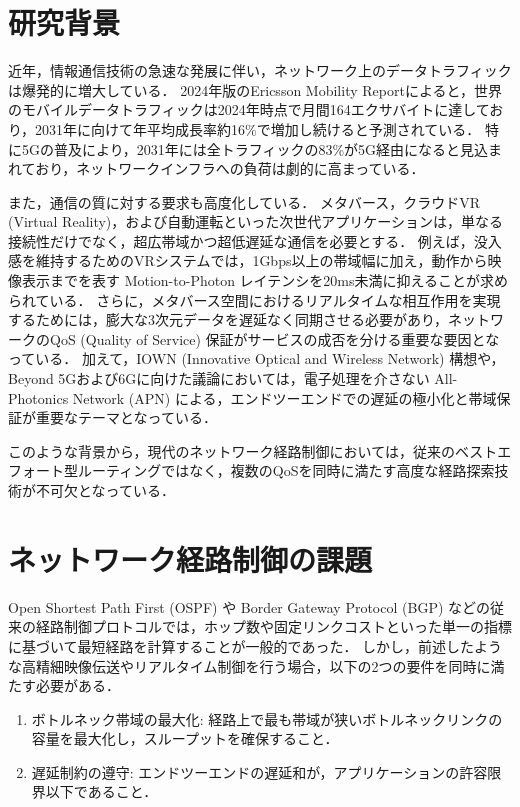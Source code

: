 \section{研究背景}
近年，情報通信技術の急速な発展に伴い，ネットワーク上のデータトラフィックは爆発的に増大している．
2024年版のEricsson Mobility Reportによると，世界のモバイルデータトラフィックは2024年時点で月間164エクサバイトに達しており，2031年に向けて年平均成長率約16\%で増加し続けると予測されている\cite{ericsson2024}．
特に5Gの普及により，2031年には全トラフィックの83\%が5G経由になると見込まれており，ネットワークインフラへの負荷は劇的に高まっている\cite{ericsson2024}．

また，通信の質に対する要求も高度化している．
メタバース，クラウドVR (Virtual Reality)，および自動運転といった次世代アプリケーションは，単なる接続性だけでなく，超広帯域かつ超低遅延な通信を必要とする．
例えば，没入感を維持するためのVRシステムでは，1Gbps以上の帯域幅に加え，動作から映像表示までを表す Motion-to-Photon レイテンシを20ms未満に抑えることが求められている\cite{sandvine2024}\cite{Yaqoob2020}．
さらに，メタバース空間におけるリアルタイムな相互作用を実現するためには，膨大な3次元データを遅延なく同期させる必要があり，ネットワークのQoS (Quality of Service) 保証がサービスの成否を分ける重要な要因となっている\cite{Hovan2021}．
加えて，IOWN (Innovative Optical and Wireless Network) 構想や，Beyond 5Gおよび6Gに向けた議論においては，電子処理を介さない All-Photonics Network (APN) による，エンドツーエンドでの遅延の極小化と帯域保証が重要なテーマとなっている\cite{iowngf2024}．

このような背景から，現代のネットワーク経路制御においては，従来のベストエフォート型ルーティングではなく，複数のQoSを同時に満たす高度な経路探索技術が不可欠となっている．

\section{ネットワーク経路制御の課題}
Open Shortest Path First (OSPF) や Border Gateway Protocol (BGP) などの従来の経路制御プロトコルでは，ホップ数や固定リンクコストといった単一の指標に基づいて最短経路を計算することが一般的であった\cite{Nurhaida2019}．
しかし，前述したような高精細映像伝送やリアルタイム制御を行う場合，以下の2つの要件を同時に満たす必要がある．

\begin{enumerate}
  \item ボトルネック帯域の最大化: 経路上で最も帯域が狭いボトルネックリンクの容量を最大化し，スループットを確保すること．
  \item 遅延制約の遵守: エンドツーエンドの遅延和が，アプリケーションの許容限界以下であること．
\end{enumerate}

